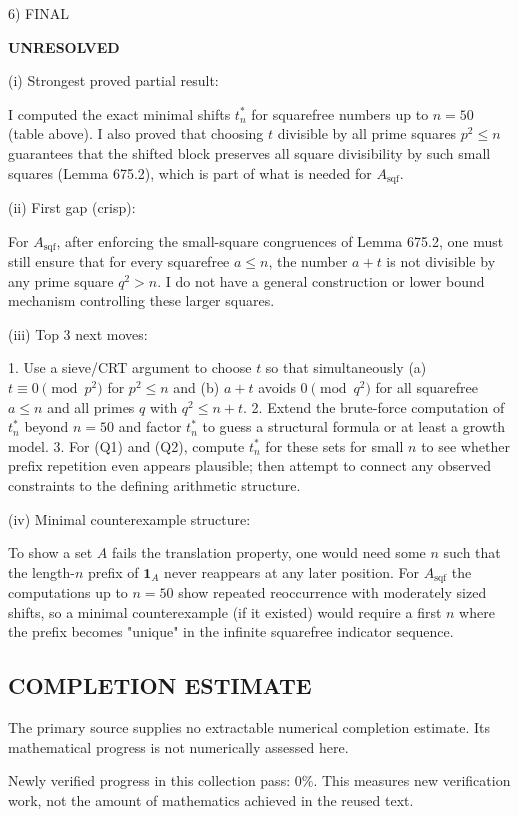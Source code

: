 6) FINAL

\textbf{UNRESOLVED}

(i) Strongest proved partial result:

I computed the exact minimal shifts $t_n^*$ for squarefree numbers up to $n=50$ (table above). I also proved that choosing $t$ divisible by all prime squares $p^2\le n$ guarantees that the shifted block preserves all square divisibility by such small squares (Lemma 675.2), which is part of what is needed for $A_{\mathrm{sqf}}$.

(ii) First gap (crisp):

For $A_{\mathrm{sqf}}$, after enforcing the small-square congruences of Lemma 675.2, one must still ensure that for every squarefree $a\le n$, the number $a+t$ is not divisible by any prime square $q^2>n$. I do not have a general construction or lower bound mechanism controlling these larger squares.

(iii) Top 3 next moves:

1. Use a sieve/CRT argument to choose $t$ so that simultaneously (a) $t\equiv 0\pmod{p^2}$ for $p^2\le n$ and (b) $a+t$ avoids $0\pmod{q^2}$ for all squarefree $a\le n$ and all primes $q$ with $q^2\le n+t$.
2. Extend the brute-force computation of $t_n^*$ beyond $n=50$ and factor $t_n^*$ to guess a structural formula or at least a growth model.
3. For (Q1) and (Q2), compute $t_n^*$ for these sets for small $n$ to see whether prefix repetition even appears plausible; then attempt to connect any observed constraints to the defining arithmetic structure.

(iv) Minimal counterexample structure:

To show a set $A$ fails the translation property, one would need some $n$ such that the length-$n$ prefix of $\mathbf 1_A$ never reappears at any later position. For $A_{\mathrm{sqf}}$ the computations up to $n=50$ show repeated reoccurrence with moderately sized shifts, so a minimal counterexample (if it existed) would require a first $n$ where the prefix becomes "unique" in the infinite squarefree indicator sequence.




\subsection*{COMPLETION ESTIMATE}
The primary source supplies no extractable numerical completion estimate. Its mathematical progress is not numerically assessed here.

Newly verified progress in this collection pass: $0\%$. This measures new verification work, not the amount of mathematics achieved in the reused text.
